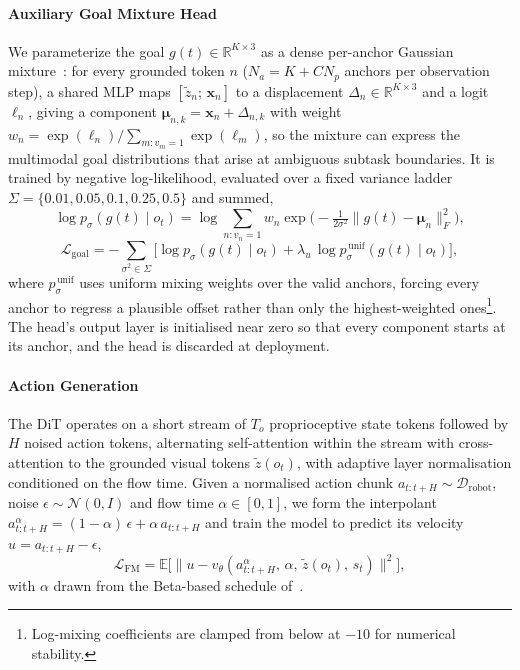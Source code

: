 \documentclass[letterpaper, 10 pt, conference]{ieeeconf}  %
\begin{document}
\paragraph{\textbf{Auxiliary Goal Mixture Head}}
We parameterize the goal $g(t)\in\mathbb{R}^{K\times 3}$ as a dense per-anchor
Gaussian mixture~\cite{ghost,articubot}: for every grounded token $n$
($N_a=K+CN_p$ anchors per observation step), a shared MLP maps
$[\tilde{z}_n;\,\mathbf{x}_n]$ to a displacement $\Delta_n\in\mathbb{R}^{K\times 3}$
and a logit $\ell_n$, giving a component
$\boldsymbol{\mu}_{n,k}=\mathbf{x}_n+\Delta_{n,k}$ with weight
$w_n=\exp(\ell_n)/\sum_{m:v_m=1}\exp(\ell_m)$, so the mixture can express the
multimodal goal distributions that arise at ambiguous subtask boundaries. It is
trained by negative log-likelihood, evaluated over a fixed variance ladder
$\Sigma=\{0.01,0.05,0.1,0.25,0.5\}$ and summed,
\begin{equation}
  \log p_{\sigma}(g(t)\mid o_t) = \log\!\sum_{n:v_n=1}w_n
  \exp\!\Big(\!-\tfrac{1}{2\sigma^2}\|g(t)-\boldsymbol{\mu}_n\|_F^2\Big),
\end{equation}
\begin{equation}
  \mathcal{L}_{\text{goal}} = -\sum_{\sigma^2\in\Sigma}\Big[\log p_{\sigma}(g(t)\mid o_t)
  + \lambda_u\,\log p^{\,\text{unif}}_{\sigma}(g(t)\mid o_t)\Big],
\end{equation}
where $p^{\,\text{unif}}_\sigma$ uses uniform mixing weights over the valid
anchors, forcing every anchor to regress a plausible offset rather than only
the highest-weighted ones\footnote{Log-mixing coefficients are clamped from
below at $-10$ for numerical stability.}. The head's output layer is
initialised near zero so that every component starts at its anchor, and the
head is discarded at deployment.

\paragraph{\textbf{Action Generation}}
The DiT operates on a short stream of $T_o$ proprioceptive state tokens
followed by $H$ noised action tokens, alternating self-attention within the
stream with cross-attention to the grounded visual tokens $\tilde{z}(o_t)$,
with adaptive layer normalisation conditioned on the flow time. Given a
normalised action chunk $a_{t:t+H}\sim\mathcal{D}_{\text{robot}}$, noise
$\epsilon\sim\mathcal{N}(0,I)$ and flow time $\alpha\in[0,1]$, we form the
interpolant $a^{\alpha}_{t:t+H}=(1-\alpha)\,\epsilon+\alpha\,a_{t:t+H}$ and train the model to predict its
velocity $u=a_{t:t+H}-\epsilon$,
\begin{equation}
  \mathcal{L}_{\text{FM}} = \mathbb{E}\big[\|u - v_\theta(a^{\alpha}_{t:t+H},\,\alpha,\,\tilde{z}(o_t),\,s_t)\big\|^2\big],
\end{equation}
with $\alpha$ drawn from the Beta-based schedule of~\cite{groot}.
\end{document}
